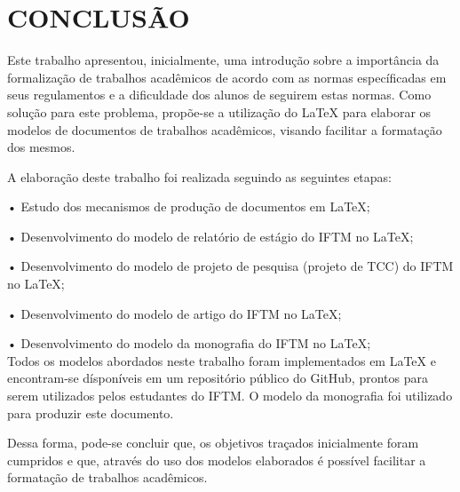 \newpage
\section{CONCLUSÃO}
Este trabalho apresentou, inicialmente, uma introdução sobre a importância da formalização de trabalhos acadêmicos de acordo com as normas específicadas em seus regulamentos e a dificuldade dos alunos de seguirem estas normas. Como solução para este problema, propõe-se a utilização do LaTeX para elaborar os modelos de documentos de trabalhos acadêmicos, visando facilitar a formatação dos mesmos.

A elaboração deste trabalho foi realizada seguindo as seguintes etapas:

•	Estudo dos mecanismos de produção de documentos em LaTeX;

•	Desenvolvimento do modelo de relatório de estágio do IFTM no LaTeX;

•	Desenvolvimento do modelo de projeto de pesquisa (projeto de TCC) do IFTM no LaTeX;

•	Desenvolvimento do modelo de artigo do IFTM no LaTeX;

•	Desenvolvimento do modelo da monografia do IFTM no LaTeX;\\

Todos os modelos abordados neste trabalho foram implementados em LaTeX e encontram-se dísponíveis em um repositório público do GitHub, prontos para serem utilizados pelos estudantes do IFTM. O modelo da monografia foi utilizado para produzir este documento. 

Dessa forma, pode-se concluir que, os objetivos traçados inicialmente foram cumpridos e que, através do uso dos modelos elaborados é possível facilitar a formatação de trabalhos acadêmicos.